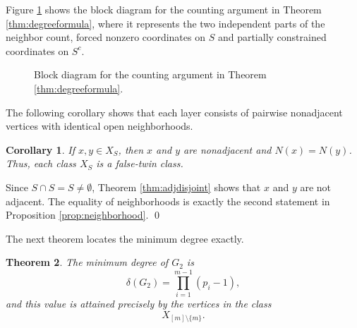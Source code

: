 \documentclass[12pt]{article}
\renewenvironment{proof}{{\bf \noindent Proof.}}{\qed}
\newtheorem{theorem}{Theorem}[section]
\newtheorem{corollary}[theorem]{Corollary}
\theoremstyle{definition}
\begin{document}
	Figure \ref{fig:degreeblock} shows the block diagram for the counting argument in Theorem \ref{thm:degreeformula}, where it represents the two independent parts of the neighbor count, forced nonzero coordinates on $S$ and partially constrained coordinates on $S^c$.
	\begin{figure}[ht]
		\centering
		\caption{Block diagram for the counting argument in Theorem \ref{thm:degreeformula}.}
		\label{fig:degreeblock}
	\end{figure}
	\medskip
	The following corollary shows that each layer consists of pairwise nonadjacent vertices with identical open neighborhoods.	
	\begin{corollary}\label{cor:falsetwins}
		If $x,y\in X_S$, then $x$ and $y$ are nonadjacent and $N(x)=N(y)$. Thus, each class $X_S$ is a false-twin class.
	\end{corollary}
	
	\begin{proof}
		Since $S\cap S=S\neq\emptyset$, Theorem \ref{thm:adjdisjoint} shows that $x$ and $y$ are not adjacent. The equality of neighborhoods is exactly the second statement in Proposition \ref{prop:neighborhood}.
	\end{proof}
	
	\medskip
	 The next theorem locates the minimum degree exactly. 
	\begin{theorem}\label{thm:mindegree}
		The minimum degree of $G_2$ is
		$$
		\delta(G_2)=\prod_{i=1}^{m-1}(p_i-1),
		$$
		and this value is attained precisely by the vertices in the class
		$$
		X_{[m]\setminus\{m\}}.
		$$
	\end{theorem}
	
\end{document}
